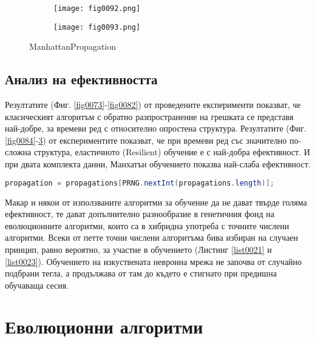 \begin{figure}[H]
  \begin{subfigure}{0.49\textwidth}
  \texttt{[image: fig0092.png]}
  \label{fig0092}
  \end{subfigure}
  \begin{subfigure}{0.49\textwidth}
  \texttt{[image: fig0093.png]}
  \label{fig0093}
  \end{subfigure}
  \caption{ManhattanPropagation}
\end{figure}

\subsection{Анализ на ефективността}

Резултатите (Фиг. \ref{fig0073}-\ref{fig0082}) от проведените експерименти показват, че класическият алгоритъм с обратно разпространение на грешката се представя най-добре, за времеви ред с относително опростена структура. Резултатите (Фиг. \ref{fig0084}-\ref{fig0093}) от експериментите показват, че при времеви ред със значително по-сложна структура, еластичното (Resilient) обучение е с най-добра ефективност. И при двата комплекта данни, Манхатън обучението показва най-слаба ефективност. 

\begin{lstlisting}[caption=Случаен избор на точните числени методи, language=Java, basicstyle=\tiny, label=list0023]
propagation = propagations[PRNG.nextInt(propagations.length)];
\end{lstlisting}

Макар и някои от използваните алгоритми за обучение да не дават твърде голяма ефективност, те дават допълнително разнообразие в генетичния фонд на еволюционните алгоритми, които са в хибридна употреба с точните числени алгоритми. Всеки от петте точни числени алгоритъма бива избиран на случаен принцип, равно вероятно, за участие в обучението (Листинг \ref{list0021} и \ref{list0023}). Обучението на изкуствената невронна мрежа не започва от случайно подбрани тегла, а продължава от там до където е стигнато при предишна обучаваща сесия. 

\section{Еволюционни алгоритми}

